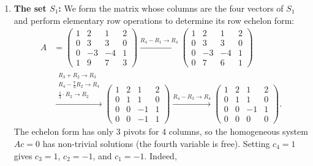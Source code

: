 \begin{exercisesolution*}
\label{sol:linear_independence_r4_lists}
\begin{enumerate}[label=\textbf{(\alph*)}]
    \item \textbf{The set $S_1$:}
    We form the matrix whose columns are the four vectors of $S_1$ and perform elementary row operations to determine its row echelon form:
    \begin{align*}
    A &= \begin{pmatrix}
    1 & 2 & 1 & 2 \\
    0 & 3 & 3 & 0 \\
    0 & -3 & -4 & 1 \\
    1 & 9 & 7 & 3
    \end{pmatrix}
    \xrightarrow{R_4 - R_1 \to R_4}
    \begin{pmatrix}
    1 & 2 & 1 & 2 \\
    0 & 3 & 3 & 0 \\
    0 & -3 & -4 & 1 \\
    0 & 7 & 6 & 1
    \end{pmatrix} \\
    &\xrightarrow{\substack{R_3 + R_2 \to R_3 \\ R_4 - \frac{7}{3} R_2 \to R_4 \\ \frac{1}{3} \cdot R_2 \to R_2}}
    \begin{pmatrix}
    1 & 2 & 1 & 2 \\
    0 & 1 & 1 & 0 \\
    0 & 0 & -1 & 1 \\
    0 & 0 & -1 & 1
    \end{pmatrix}
    \xrightarrow{R_4 - R_3 \to R_4}
    \begin{pmatrix}
    1 & 2 & 1 & 2 \\
    0 & 1 & 1 & 0 \\
    0 & 0 & -1 & 1 \\
    0 & 0 & 0 & 0
    \end{pmatrix}.
    \end{align*}
    The echelon form has only $3$ pivots for $4$ columns, so the homogeneous system $A c = 0$ has non-trivial solutions (the fourth variable is free). Setting $c_4 = 1$ gives $c_3 = 1$, $c_2 = -1$, and $c_1 = -1$. Indeed,
    \[
\]
\end{enumerate}
\end{exercisesolution*}
